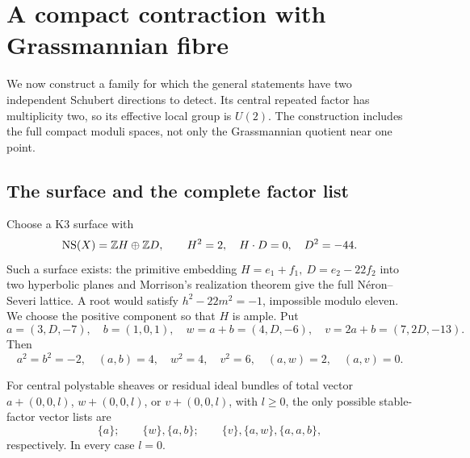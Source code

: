 \section{A compact contraction with Grassmannian fibre}\label{sec:construction}

We now construct a family for which the general statements have
two independent Schubert directions to detect.
Its central repeated factor has multiplicity two, so its effective
local group is \(U(2)\). The construction includes the full compact
moduli spaces, not only the Grassmannian quotient near one point.

\subsection{The surface and the complete factor list}
Choose a K3 surface with
\begin{equation}\label{eq:rankseven-lattice}
 \operatorname{NS}(X)=\mathbb Z H\oplus\mathbb Z D,\qquad H^2=2,\quad H\cdot D=0,\quad D^2=-44.
\end{equation}
Such a surface exists: the primitive embedding
\(H=e_1+f_1,\ D=e_2-22f_2\) into two hyperbolic planes and
Morrison's realization theorem
\cite[Corollary~2.9(i)]{morrison} give the full Néron--Severi
lattice. A root would satisfy \(h^2-22m^2=-1\), impossible modulo
eleven. We choose the positive component so that \(H\) is ample.
Put
\begin{equation}\label{eq:rankseven-vectors}
 a=(3,D,-7),\quad b=(1,0,1),\quad
 w=a+b=(4,D,-6),\quad v=2a+b=(7,2D,-13).
\end{equation}
Then
\[
 a^2=b^2=-2,\quad(a,b)=4,\quad w^2=4,\quad v^2=6,\quad
 (a,w)=2,\quad(a,v)=0.
\]

\begin{lemma}\label{lem:rank-list}
For central polystable sheaves or residual ideal bundles of total
vector \(a+(0,0,l)\), \(w+(0,0,l)\), or \(v+(0,0,l)\), with
\(l\ge0\), the only possible stable-factor vector lists are
\[
 \{a\};\qquad \{w\},\{a,b\};\qquad
 \{v\},\{a,w\},\{a,a,b\},
\]
respectively. In every case \(l=0\).
\end{lemma}

